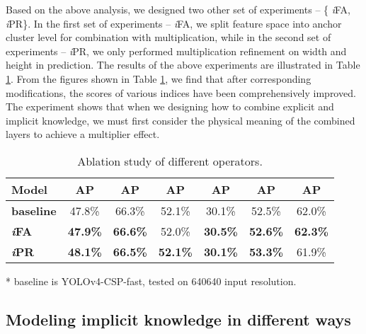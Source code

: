\documentclass[10pt,twocolumn,letterpaper]{article}
\begin{document}
Based on the above analysis, we designed two other set of experiments -- \{ \textit{i}FA,  \textit{i}PR\}. In the first set of experiments --  \textit{i}FA, we split feature space into anchor cluster level for combination with multiplication, while in the second set of experiments --  \textit{i}PR, we only performed multiplication refinement on width and height in prediction. The results of the above experiments are illustrated in Table \ref{table:e5}. From the figures shown in Table \ref{table:e5}, we find that after corresponding modifications, the scores of various indices have been comprehensively improved. The experiment shows that when we designing how to combine explicit and implicit knowledge, we must first consider the physical meaning of the combined layers to achieve a multiplier effect.

\begin{table}[h]
	\vspace{-2mm}
	\centering
	\begin{threeparttable}[h]
		\footnotesize
		\caption{Ablation study of different operators.}
		\label{table:e5}
		\setlength\tabcolsep{4.5pt}
		\begin{tabular}{lcccccc}
			\toprule
			\textbf{Model} & \textbf{AP} & \textbf{AP} & \textbf{AP} & \textbf{AP} & \textbf{AP} & \textbf{AP} \\				
			\midrule
			\textbf{baseline} & 47.8\% & 66.3\% & 52.1\% & 30.1\% & 52.5\% & 62.0\% \\				
			\midrule
			\textbf{ \textit{i}FA} & \textbf{47.9\%} & \textbf{66.6\%} & 52.0\% & \textbf{30.5\%} & \textbf{52.6\%} & \textbf{62.3\%} \\
			\textbf{ \textit{i}PR} & \textbf{48.1\%} & \textbf{66.5\%} & \textbf{52.1\%} & \textbf{30.1\%} & \textbf{53.3\%} & 61.9\% \\
			\bottomrule
		\end{tabular}
		\begin{tablenotes}[flushleft]
			\footnotesize
			\item[*] baseline is YOLOv4-CSP-fast, tested on 640640 input resolution.
		\end{tablenotes}
	\end{threeparttable}
    \vspace{-2mm}
\end{table}

\newpage

\subsection{Modeling implicit knowledge in different ways}
\label{sec:ima}
\end{document}
